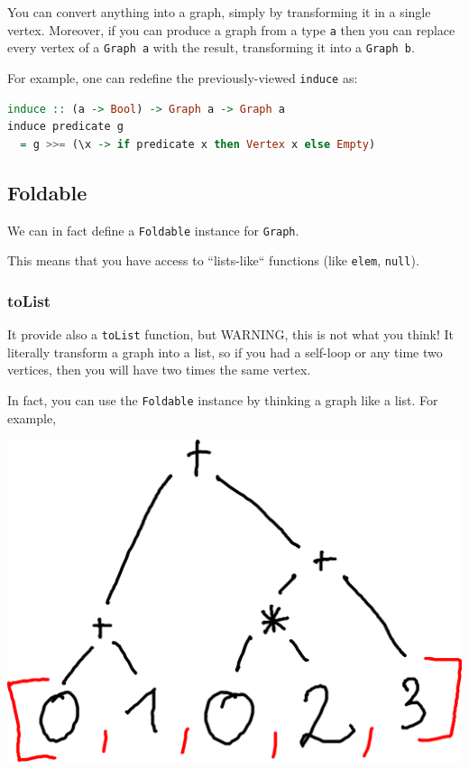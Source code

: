 \documentclass[10pt,a4paper]{article}
\begin{document}
You can convert anything into a graph, simply by transforming it in a single vertex. Moreover, if you can produce a graph from a type \verb|a| then you can replace every vertex of a \verb|Graph a| with the result, transforming it into a \verb|Graph b|.

For example, one can redefine the previously-viewed \verb|induce| as:

\begin{lstlisting}[language=Haskell, frame=single]
induce :: (a -> Bool) -> Graph a -> Graph a
induce predicate g
  = g >>= (\x -> if predicate x then Vertex x else Empty)
\end{lstlisting}

\subsection{Foldable}
We can in fact define a \verb|Foldable| instance for \verb|Graph|.

This means that you have access to ``lists-like`` functions (like \verb|elem|, \verb|null|). 

\subsubsection{toList}
It provide also a \verb|toList| function, but WARNING, this is not what you think! It literally transform a graph into a list, so if you had a self-loop or any time two vertices, then you will have two times the same vertex.

In fact, you can use the \verb|Foldable| instance by thinking a graph like a list. For example, 

\begin{center}
	\includegraphics[scale=0.5]{figspng/foldable.png}
\end{center}
\end{document}
